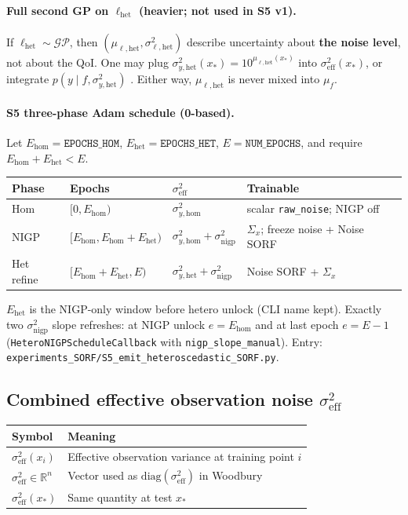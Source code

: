\documentclass[11pt]{article}
\newcommand{\sighet}{\sigma_{y,\mathrm{het}}^{2}}%
\newcommand{\signigp}{\sigma_{\mathrm{nigp}}^{2}}%
\newcommand{\sigeff}{\sigma_{\mathrm{eff}}^{2}}%
\newcommand{\Sigx}{\Sigma_{x}}%
\begin{document}
\paragraph{Full second GP on $\ell_{\mathrm{het}}$ (heavier; not used in S5 v1).}
If $\ell_{\mathrm{het}}\sim\mathcal{GP}$, then
$(\mu_{\ell,\mathrm{het}},\sigma_{\ell,\mathrm{het}}^{2})$ describe uncertainty about
\textbf{the noise level}, not about the QoI.
One may plug $\sighet(x_*)=10^{\mu_{\ell,\mathrm{het}}(x_*)}$ into $\sigeff(x_*)$,
or integrate $p(y\mid f,\sighet)$
\cite{goldberg1998heteroscedastic,lazaro2011vhgp}.
Either way, $\mu_{\ell,\mathrm{het}}$ is never mixed into $\mu_f$.

\paragraph{S5 three-phase Adam schedule (0-based).}
\label{sec:s5-schedule}
Let $E_{\mathrm{hom}}=\texttt{EPOCHS\_HOM}$, $E_{\mathrm{het}}=\texttt{EPOCHS\_HET}$,
$E=\texttt{NUM\_EPOCHS}$, and require $E_{\mathrm{hom}}+E_{\mathrm{het}}<E$.
\begin{center}
\small
\begin{tabular}{@{}llll@{}}
\toprule
\textbf{Phase} & \textbf{Epochs} & $\sigeff$ & \textbf{Trainable} \\
\midrule
Hom & $[0,E_{\mathrm{hom}})$ & $\sigma_{y,\mathrm{hom}}^{2}$ & scalar \texttt{raw\_noise}; NIGP off \\
NIGP & $[E_{\mathrm{hom}},E_{\mathrm{hom}}+E_{\mathrm{het}})$ & $\sigma_{y,\mathrm{hom}}^{2}+\signigp$ & $\Sigx$; freeze noise + Noise SORF \\
Het refine & $[E_{\mathrm{hom}}+E_{\mathrm{het}},E)$ & $\sighet+\signigp$ & Noise SORF + $\Sigx$ \\
\bottomrule
\end{tabular}
\end{center}
$E_{\mathrm{het}}$ is the NIGP-only window before hetero unlock (CLI name kept).
Exactly two $\signigp$ slope refreshes: at NIGP unlock
$e=E_{\mathrm{hom}}$ and at last epoch $e=E-1$
(\texttt{HeteroNIGPScheduleCallback} with \texttt{nigp\_slope\_manual}).
Entry: \texttt{experiments\_SORF/S5\_emit\_heteroscedastic\_SORF.py}.

\subsection{Combined effective observation noise $\sigeff$}
\begin{center}
\small
\begin{tabularx}{\textwidth}{@{}>{\raggedright\arraybackslash}p{}
  >{\raggedright\arraybackslash}X@{}}
\toprule
\textbf{Symbol} & \textbf{Meaning} \\
\midrule
$\sigeff(x_i)$ & Effective observation variance at training point $i$ \\
$\sigeff\in\mathbb{R}^{n}$ & Vector used as $\mathrm{diag}(\sigeff)$ in Woodbury \\
$\sigeff(x_*)$ & Same quantity at test $x_*$ \\
\bottomrule
\end{tabularx}
\end{center}
\end{document}
